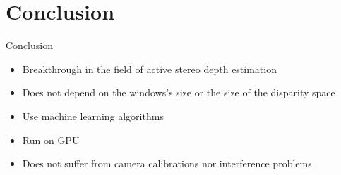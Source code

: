 \section{Conclusion}
\begin{frame}{Conclusion}
\begin{itemize}
\item Breakthrough in the field of active stereo depth estimation 
\item Does not depend on the windows's size or the size of the disparity space
\item Use machine learning algorithms
\item Run on GPU
\item Does not suffer from camera calibrations nor interference problems
\end{itemize}
\end{frame}
